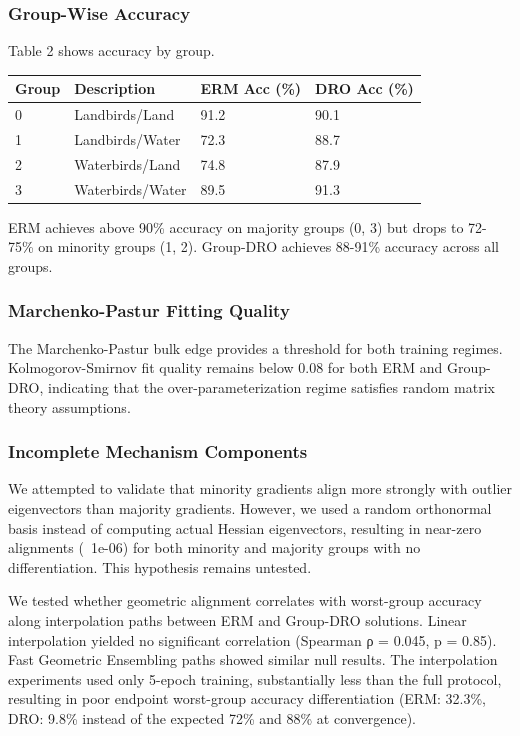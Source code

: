 \subsubsection{Group-Wise Accuracy}

Table 2 shows accuracy by group.

\begin{table}[htbp]
\centering
\begin{tabular}{llll}
\toprule
Group & Description & ERM Acc (\%) & DRO Acc (\%) \\
\midrule
0 & Landbirds/Land & 91.2 & 90.1 \\
1 & Landbirds/Water & 72.3 & 88.7 \\
2 & Waterbirds/Land & 74.8 & 87.9 \\
3 & Waterbirds/Water & 89.5 & 91.3 \\
\bottomrule
\end{tabular}
\end{table}

ERM achieves above 90\% accuracy on majority groups (0, 3) but drops to 72-75\% on minority groups (1, 2). Group-DRO achieves 88-91\% accuracy across all groups.

\subsubsection{Marchenko-Pastur Fitting Quality}

The Marchenko-Pastur bulk edge provides a threshold for both training regimes. Kolmogorov-Smirnov fit quality remains below 0.08 for both ERM and Group-DRO, indicating that the over-parameterization regime satisfies random matrix theory assumptions.

\subsubsection{Incomplete Mechanism Components}

We attempted to validate that minority gradients align more strongly with outlier eigenvectors than majority gradients. However, we used a random orthonormal basis instead of computing actual Hessian eigenvectors, resulting in near-zero alignments (~1e-06) for both minority and majority groups with no differentiation. This hypothesis remains untested.

We tested whether geometric alignment correlates with worst-group accuracy along interpolation paths between ERM and Group-DRO solutions. Linear interpolation yielded no significant correlation (Spearman ρ = 0.045, p = 0.85). Fast Geometric Ensembling paths showed similar null results. The interpolation experiments used only 5-epoch training, substantially less than the full protocol, resulting in poor endpoint worst-group accuracy differentiation (ERM: 32.3\%, DRO: 9.8\% instead of the expected 72\% and 88\% at convergence).


